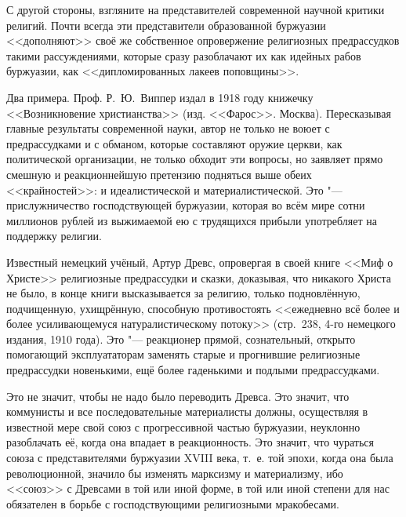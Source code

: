 С другой стороны, взгляните на представителей современной научной критики
религий. Почти всегда эти представители образованной буржуазии <<дополняют>>
своё же собственное опровержение религиозных предрассудков такими
рассуждениями, которые сразу разоблачают их как идейных рабов буржуазии,
как <<дипломированных лакеев поповщины>>.

Два примера. Проф. Р.~Ю.~Виппер издал в 1918 году книжечку <<Возникновение
христианства>> (изд. <<Фарос>>. Москва). Пересказывая главные результаты
современной науки, автор не только не воюет с предрассудками и с обманом,
которые составляют оружие церкви, как политической организации, не только
обходит эти вопросы, но заявляет прямо смешную и реакционнейшую претензию
подняться выше обеих <<крайностей>>: и идеалистической и
материалистической. Это "--- прислужничество господствующей буржуазии,
которая во всём мире сотни миллионов рублей из выжимаемой ею с трудящихся
прибыли употребляет на поддержку религии.

Известный немецкий учёный, Артур Древс, опровергая в своей книге <<Миф о
Христе>> религиозные предрассудки и сказки, доказывая, что никакого Христа
не было, в конце книги высказывается за религию, только подновлённую,
подчищенную, ухищрённую, способную противостоять <<ежедневно всё более и
более усиливающемуся натуралистическому потоку>> (стр.~238, 4-го немецкого
издания, 1910 года). Это "--- реакционер прямой, сознательный, открыто
помогающий эксплуататорам заменять старые и прогнившие религиозные
предрассудки новенькими, ещё более гаденькими и подлыми предрассудками.

Это не значит, чтобы не надо было переводить Древса. Это значит, что
коммунисты и все последовательные материалисты должны, осуществляя в
известной мере свой союз с прогрессивной частью буржуазии, неуклонно
разоблачать её, когда она впадает в реакционность. Это значит, что чураться
союза с представителями буржуазии XVIII века, т.~е. той эпохи, когда она
была революционной, значило бы изменять марксизму и материализму, ибо
<<союз>> с Древсами в той или иной форме, в той или иной степени для нас
обязателен в борьбе с господствующими религиозными мракобесами.

